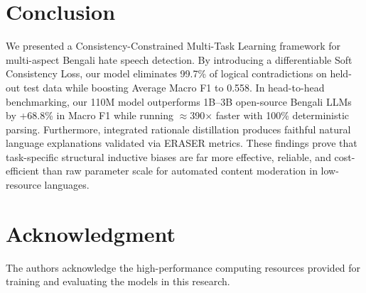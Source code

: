 \documentclass[conference]{IEEEtran}
\begin{document}
\begin{table}[t]
\caption{Qualitative Examples Illustrating Dual-Layer Explainability}
\label{tab:qualitative}
\begin{center}
\end{center}
\end{table}

\section{Conclusion}
We presented a Consistency-Constrained Multi-Task Learning framework for multi-aspect Bengali hate speech detection. By introducing a differentiable Soft Consistency Loss, our model eliminates 99.7\% of logical contradictions on held-out test data while boosting Average Macro F1 to 0.558. In head-to-head benchmarking, our 110M model outperforms 1B--3B open-source Bengali LLMs by +68.8\% in Macro F1 while running $\approx$390$\times$ faster with 100\% deterministic parsing. Furthermore, integrated rationale distillation produces faithful natural language explanations validated via ERASER metrics. These findings prove that task-specific structural inductive biases are far more effective, reliable, and cost-efficient than raw parameter scale for automated content moderation in low-resource languages.

\section*{Acknowledgment}
The authors acknowledge the high-performance computing resources provided for training and evaluating the models in this research.



\end{document}
